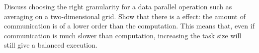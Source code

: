   Discuss choosing the right granularity for a data parallel operation
  such as averaging on a two-dimensional grid. Show that there is a
   effect: the amount of communication is
  of a lower order than the computation. This means that, even if
  communication is much slower than computation, increasing the task
  size will still give a balanced execution.
